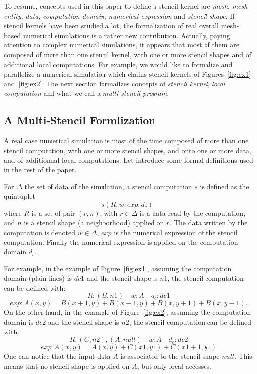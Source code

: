 To resume, concepts used in this paper to define a stencil kernel are \emph{mesh}, \emph{mesh entity}, \emph{data}, \emph{computation domain}, \emph{numerical expression} and \emph{stencil shape}. 
If stencil kernels have been studied a lot, the formalization of real overall mesh-based numerical simulations is a rather new contribution. Actually, paying attention to complex numerical simulations, it appears that most of them are composed of more than one stencil kernel, with one or more stencil shapes and of additional local computations. For example, we would like to formalize and parallelize a numerical simulation which chains stencil kernels of Figures~\ref{fig:ex1} and~\ref{fig:ex2}. The next section formalizes concepts of \emph{stencil kernel}, \emph{local computation} and what we call a \emph{multi-stencil program}.

\subsection{A Multi-Stencil Formlization}
\label{sect:multistencil}
A real case numerical simulation is most of the time composed of more than one stencil computation, with one or more stencil shapes, and onto one or more data, and of additionnal local computations.
Let introduce some formal definitions used in the rest of the paper.

For $\Delta$ the set of data of the simulation, a stencil computation $s$ is defined as the quintuplet
\begin{equation} 
s(R,w,exp,d_c),
\label{eq:st}
\end{equation}
where $R$ is a set of pair $(r,n)$, with $r \in \Delta$ is a data read by the computation, and $n$ is a stencil shape (a neighborhood) applied on $r$. The data written by the computation is denoted $w \in \Delta$, $exp$ is the numerical expression of the stencil computation. Finally the numerical expression is applied on the computation domain $d_c$.

For example, in the example of Figure~\ref{fig:ex1}, assuming the computation domain (plain lines) is $dc1$ and the stencil shape is $n1$, the stencil computation can be defined with:
\begin{equation*}
R: {(B,n1)} \quad w: A \quad d_c: dc1
\end{equation*}
\begin{equation*}
exp: A(x,y)=B(x+1,y)+B(x-1,y)+B(x,y+1)+B(x,y-1).
\end{equation*}
On the other hand, in the example of Figure~\ref{fig:ex2}, assuming the computation domain is $dc2$ and the stencil shape is $n2$, the stencil computation can be defined with:
\begin{equation*}
R: {(C,n2),(A,null)} \quad w: A \quad d_c: dc2
\end{equation*}
\begin{equation*}
exp: A(x,y)=A(x,y)+C(x1,y1)+C(x1+1,y1)
\end{equation*}
One can notice that the input data $A$ is associated to the stencil shape $null$. This means that no stencil shape is applied on $A$, but only local accesses.

